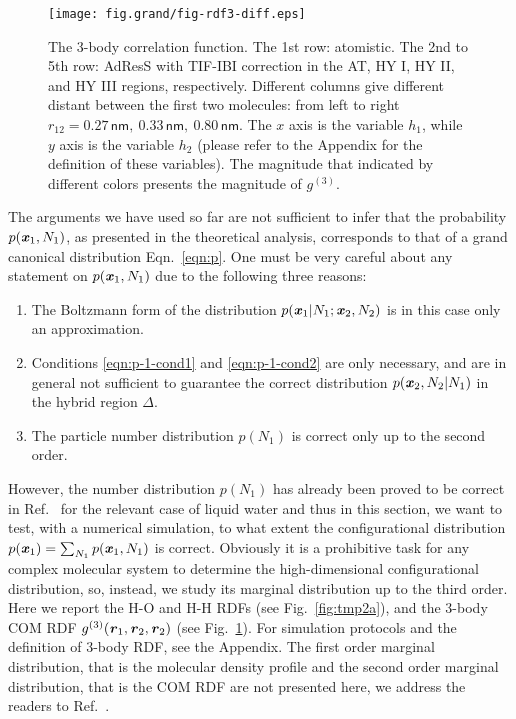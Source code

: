 \documentclass[aip,jcp,a4paper,reprint,onecolumn]{revtex4-1}
\newcommand{\vect}[1]{\textbf{\textit{#1}}}
\newcommand{\HY}{{\Delta}}
\begin{document}
\begin{figure}
  \centering
  \texttt{[image: fig.grand/fig-rdf3-diff.eps]}
  \caption{The 3-body correlation function.  The 1st row:
    atomistic.
    The 2nd to 5th row:
    AdResS with TIF-IBI correction in the AT, HY I, HY II, and HY III
    regions, respectively.
    Different columns give different distant between
    the first two molecules: from left to right $r_{12} =
    0.27\,\textsf{nm},\ 0.33\,\textsf{nm},\  
    0.80\,\textsf{nm}$.  The $x$ axis is the variable $h_1$, while $y$
    axis is the variable $h_2$ (please refer to the Appendix for the
    definition of these variables).  The magnitude that indicated by
    different colors presents the magnitude of $g^{(3)}$.
  }
  \label{fig:tmp2b}
\end{figure}

The arguments we have used so far are not sufficient to infer that the probability $p(\vect x_1 , N_1)$,
as presented in the theoretical analysis, corresponds to that of a grand canonical distribution  Eqn.~\eqref{eqn:p}.
One must be very careful about any statement on $p(\vect x_1, N_1)$ 
due to the following three reasons:
\begin{enumerate}
\item The Boltzmann form of the distribution $p(\vect x_1|N_1; \vect x_2, N_2)$
is in this case only an approximation.
\item Conditions \eqref{eqn:p-1-cond1} and \eqref{eqn:p-1-cond2}
are only necessary, and are in general not sufficient to guarantee
the correct distribution $p(\vect x_2, N_2 | N_1)$ in the hybrid region $\HY$.
\item The particle number distribution $p(N_1)$ is correct only up to the second order.
\end{enumerate}
However, the number distribution $p(N_1)$ has already
been proved to be correct in Ref.~\cite{prlgc, rdfcorr} for the relevant case of liquid water and thus in this section, we want to test, with a numerical simulation, to what extent the configurational distribution $p(\vect x_1) = \sum_{N_1}p(\vect x_1, N_1)$ is correct. 
Obviously it is a prohibitive task for any complex molecular system to determine the high-dimensional configurational distribution,
so, instead, we study its marginal distribution up to the third order.
Here we report the H-O and H-H RDFs (see Fig.~\ref{fig:tmp2a}), and the 3-body COM
RDF $g^{(3)}(\vect r_1, \vect r_2, \vect r_2)$ (see Fig.~\ref{fig:tmp2b}). For simulation
protocols and the definition of 3-body RDF, see the Appendix.
The first order marginal distribution, that is the molecular density profile and the second order marginal distribution, that is the COM RDF are not presented here, we address the readers to Ref.~\cite{rdfcorr}. 
\end{document}
